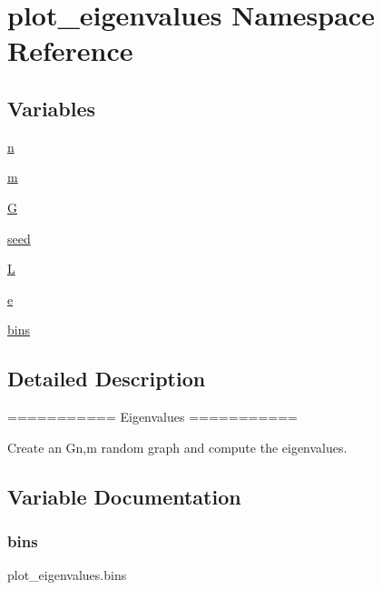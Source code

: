 \hypertarget{namespaceplot__eigenvalues}{}\section{plot\+\_\+eigenvalues Namespace Reference}
\label{namespaceplot__eigenvalues}
\subsection*{Variables}
\begin{DoxyCompactItemize}
\item 
\hyperlink{namespaceplot__eigenvalues_a8d0fa546de4fe6058b0ec7380f12705c}{n}
\item 
\hyperlink{namespaceplot__eigenvalues_a58f7f4b1e71720b1b2c717169c1daef5}{m}
\item 
\hyperlink{namespaceplot__eigenvalues_ad87b69353e34b03bf905427135f2e586}{G}
\item 
\hyperlink{namespaceplot__eigenvalues_a80b12cbe45491b16d881436e7ca82397}{seed}
\item 
\hyperlink{namespaceplot__eigenvalues_a71540c4ba801154f698f6dc8c29ab0e8}{L}
\item 
\hyperlink{namespaceplot__eigenvalues_a8a3958eb0511c67bdb1b416f2a3c8740}{e}
\item 
\hyperlink{namespaceplot__eigenvalues_a559e0b03f4e220f6e9482b65eaa7daee}{bins}
\end{DoxyCompactItemize}


\subsection{Detailed Description}
\begin{DoxyVerb}===========
Eigenvalues
===========

Create an G{n,m} random graph and compute the eigenvalues.
\end{DoxyVerb}
 

\subsection{Variable Documentation}
\mbox{\label{namespaceplot__eigenvalues_a559e0b03f4e220f6e9482b65eaa7daee}} 
\subsubsection{\texorpdfstring{bins}{bins}}
{\footnotesize\ttfamily plot\+\_\+eigenvalues.\+bins}

